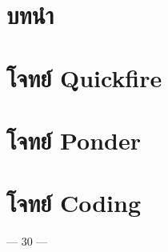 \documentclass{techjam-codequestions}
\begin{document}
\chapter*{บทนำ}


\chapter{โจทย์ Quickfire}


\chapter{โจทย์ Ponder}


\chapter{โจทย์ Coding}


\vspace*{\fill}
\begin{center}
    --- 30 ---
\end{center}
\end{document}
